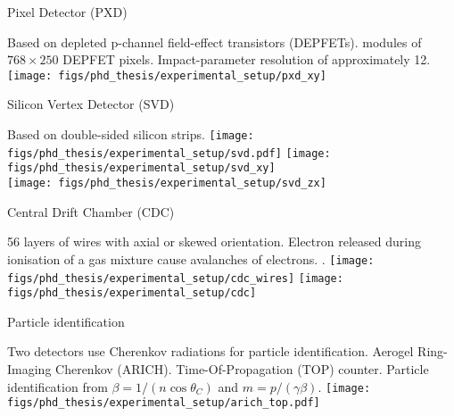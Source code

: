 \begin{frame}[noframenumbering]{Pixel Detector (PXD)}
\bi
\item Based on depleted p-channel field-effect transistors (DEPFETs).
 modules of $768\times 250$ DEPFET pixels.
\itemii Impact-parameter resolution of approximately 12\mum.
\ei
\vspace{0.5cm}
\centering
\texttt{[image: figs/phd\_thesis/experimental\_setup/pxd\_xy]}
\end{frame}
\begin{frame}[noframenumbering]{Silicon Vertex Detector (SVD)}
\bi
\item Based on double-sided silicon strips.
\ei
\vspace{0.25cm}
\centering
\texttt{[image: figs/phd\_thesis/experimental\_setup/svd.pdf]}
\texttt{[image: figs/phd\_thesis/experimental\_setup/svd\_xy]}\\
\texttt{[image: figs/phd\_thesis/experimental\_setup/svd\_zx]}
\end{frame}
\begin{frame}[noframenumbering]{Central Drift Chamber (CDC)}
\bi
\item 56 layers of wires with axial or skewed orientation.
\itemii Electron released during ionisation of a gas mixture cause avalanches of electrons.
.
\ei
\vspace{0.5cm}
\centering
\texttt{[image: figs/phd\_thesis/experimental\_setup/cdc\_wires]}
\texttt{[image: figs/phd\_thesis/experimental\_setup/cdc]}
\end{frame}
\begin{frame}[noframenumbering]{Particle identification}
\bi
\item Two detectors use Cherenkov radiations for particle identification.
\bi
\itemii Aerogel Ring-Imaging Cherenkov (ARICH).
\itemii Time-Of-Propagation (TOP) counter.
\ei
\itemii Particle identification from $\beta=1/(n \cos \theta_C)$ and $m=p/(\gamma\beta)$.
\ei
\vspace{0.5cm}
\centering
\texttt{[image: figs/phd\_thesis/experimental\_setup/arich\_top.pdf]}
\end{frame}

